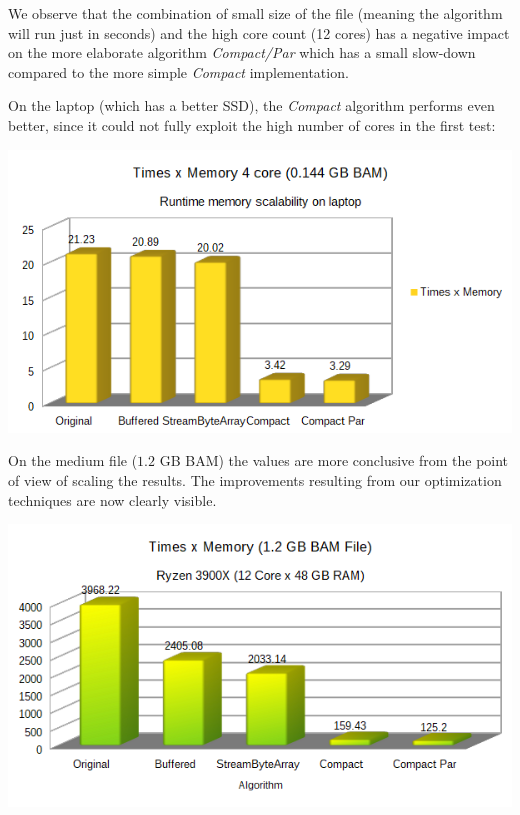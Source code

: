 \documentclass[a4paper,twoside]{article}
\begin{document}
We observe that the combination of small size of the file (meaning the algorithm will run just in seconds) and the high core count (12 cores) has a negative impact on the more elaborate algorithm {\it Compact/Par} which has a small slow-down compared to the more simple {\it Compact} implementation.

On the laptop (which has a better SSD), the {\it Compact} algorithm performs even better, since it could not fully exploit the high number of cores in the first test:

\begin{center}
	\includegraphics[scale=0.5]{images/times_and_memory_chart_small_144mb_intel.png}
\end{center}


On the medium file ($1.2$ GB BAM) the values are more conclusive from the point of view of scaling the results. The improvements resulting from our optimization techniques are now clearly visible.

\begin{center}
	\includegraphics[scale=0.5]{images/times_and_memory_chart.png}
\end{center}
\end{document}
